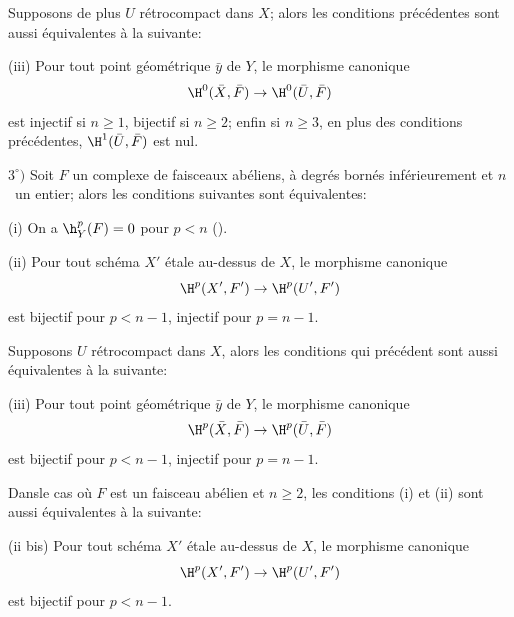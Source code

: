 \begin{proposition}
Supposons de plus $U$ r\'etrocompact dans $X$; alors les conditions pr\'ec\'edentes sont aussi \'equivalentes \`a la suivante:

\textup{(iii)} Pour tout point g\'eom\'etrique $\bar{y}$ de $Y$, le morphisme canonique
$$
\H^0(\bar{X}, \bar{F})\to \H^0(\bar{U}, \bar{F})
$$
est injectif si $n\geq 1$, bijectif si $n\geq 2$; enfin si $n\geq 3$, en plus des conditions pr\'ec\'edentes, $\H^1(\bar{U}, \bar{F})$ est nul.

$3^\circ)$ Soit $F$ un complexe de faisceaux ab\'eliens, \`a degr\'es born\'es inf\'erieurement et $n$~un entier; alors les conditions suivantes sont \'equivalentes:

\textup{(i)} On a ${\h}_Y^p(F)=0$ pour $p<n$ ().

\textup{(ii)} Pour tout sch\'ema $X'$ \'etale au-dessus de $X$, le morphisme canonique
$$
\H^p(X', F')\to \H^p(U', F')
$$
est bijectif pour $p<n-1$, injectif pour $p=n-1$.

Supposons $U$ r\'etrocompact dans $X$, alors les conditions qui pr\'ec\'edent sont aussi \'equivalentes \`a la suivante:

\textup{(iii)} Pour tout point g\'eom\'etrique $\bar{y}$ de $Y$, le morphisme canonique
$$
\H^p(\bar{X}, \bar{F})\to \H^p(\bar{U}, \bar{F})$$
est bijectif pour $p<n-1$, injectif pour $p=n-1$.

Dans\pageoriginale le cas o\`u $F$ est un faisceau ab\'elien et $n\geq 2$, les conditions \textup{(i)} et \textup{(ii)} sont aussi \'equivalentes \`a la suivante:

\textup{(ii bis)} Pour tout sch\'ema $X'$ \'etale au-dessus de $X$, le morphisme canonique
$$
\H^p(X', F')\to \H^p(U', F')$$
est bijectif pour $p<n-1$.
\end{proposition}


